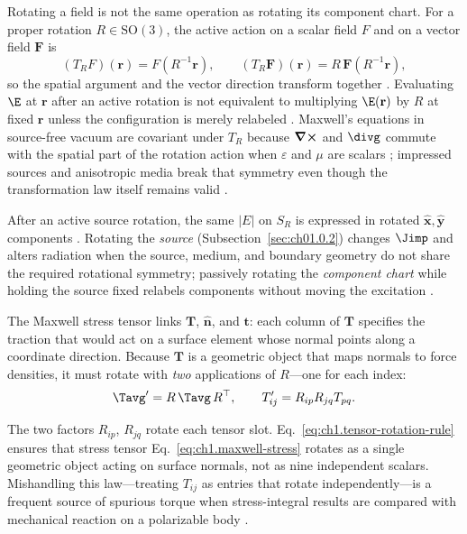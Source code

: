 Rotating a field is not the same operation as rotating its component chart. For a proper rotation $R\in\mathrm{SO}(3)$, the active action on a scalar field $F$ and on a vector field $\mathbf{F}$ is
\begin{equation}
\label{eq:ch1.field-rotation-operator}
(T_R F)(\mathbf{r})=F(R^{-1}\mathbf{r}),
\qquad
(T_R\mathbf{F})(\mathbf{r})=R\,\mathbf{F}(R^{-1}\mathbf{r}),
\end{equation}
so the spatial argument and the vector direction transform together \cite{jackson1999}. Evaluating $\E$ at $\mathbf{r}$ after an active rotation is not equivalent to multiplying $\E(\mathbf{r})$ by $R$ at fixed $\mathbf{r}$ unless the configuration is merely relabeled \cite{stratton1941}. Maxwell's equations in source-free vacuum are covariant under $T_R$ because $\curl$ and $\divg$ commute with the spatial part of the rotation action when $\varepsilon$ and $\mu$ are scalars \cite{maxwell1873}; impressed sources and anisotropic media break that symmetry even though the transformation law itself remains valid \cite{stratton1941}.

After an active source rotation, the same $|E|$ on $S_R$ is expressed in rotated $\hat{\mathbf{x}},\hat{\mathbf{y}}$ components \cite{hansen1988}. Rotating the \emph{source} (Subsection~\ref{sec:ch01.0.2}) changes $\Jimp$ and alters radiation when the source, medium, and boundary geometry do not share the required rotational symmetry; passively rotating the \emph{component chart} while holding the source fixed relabels components without moving the excitation \cite{stratton1941}.

The Maxwell stress tensor links $\mathbf{T}$, $\hat{\mathbf{n}}$, and $\mathbf{t}$: each column of $\mathbf{T}$ specifies the traction that would act on a surface element whose normal points along a coordinate direction. Because $\mathbf{T}$ is a geometric object that maps normals to force densities, it must rotate with \emph{two} applications of $R$---one for each index:
\begin{equation}
\label{eq:ch1.passive-rotation-action}\Tavg' = R\,\Tavg\,R^\top,
\qquad
T'_{ij}=R_{ip}R_{jq}T_{pq}.
\end{equation}
\addtocounter{equation}{-1}\label{eq:ch1.tensor-rotation-rule}%
\addtocounter{equation}{-1}\label{eq:ch1.vector-observable-covariance}%
The two factors \(R_{ip}\), \(R_{jq}\) rotate each tensor slot. Eq.~\eqref{eq:ch1.tensor-rotation-rule} ensures that stress tensor
Eq.~\eqref{eq:ch1.maxwell-stress} rotates as a single geometric object acting on surface normals, not as nine independent scalars.
Mishandling this law---treating $T_{ij}$ as entries that rotate independently---is a frequent source of spurious torque when stress-integral results are compared with mechanical reaction on a polarizable body \cite{beth1936}.

